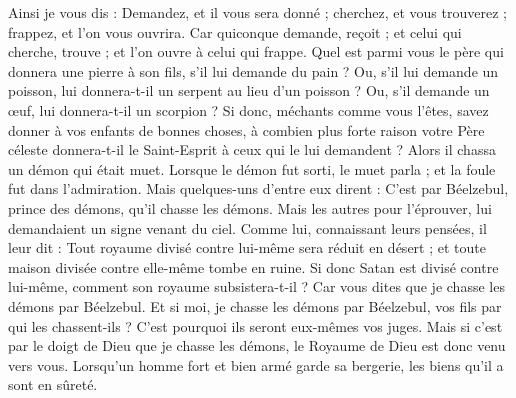 \begin{multicols}{2}
Ainsi je vous dis : Demandez, et il vous sera donné ; cherchez, et vous trouverez ; frappez, et l'on vous ouvrira.
Car quiconque demande, reçoit ; et celui qui cherche, trouve ; et l'on ouvre à celui qui frappe.
Quel est parmi vous le père qui donnera une pierre à son fils, s'il lui demande du pain ? Ou, s'il lui demande un poisson, lui donnera-t-il un serpent au lieu d'un poisson ?
Ou, s'il demande un œuf, lui donnera-t-il un scorpion ?
Si donc, méchants comme vous l'êtes, savez donner à vos enfants de bonnes choses, à combien plus forte raison votre Père céleste donnera-t-il le Saint-Esprit à ceux qui le lui demandent ?
Alors il chassa un démon qui était muet. Lorsque le démon fut sorti, le muet parla ; et la foule fut dans l'admiration.
Mais quelques-uns d'entre eux dirent : C'est par Béelzebul, prince des démons, qu'il chasse les démons.
Mais les autres pour l'éprouver, lui demandaient un signe venant du ciel.
Comme lui, connaissant leurs pensées, il leur dit : Tout royaume divisé contre lui-même sera réduit en désert ; et toute maison divisée contre elle-même tombe en ruine.
Si donc Satan est divisé contre lui-même, comment son royaume subsistera-t-il ? Car vous dites que je chasse les démons par Béelzebul.
Et si moi, je chasse les démons par Béelzebul, vos fils par qui les chassent-ils ? C'est pourquoi ils seront eux-mêmes vos juges.
Mais si c'est par le doigt de Dieu que je chasse les démons, le Royaume de Dieu est donc venu vers vous.
Lorsqu'un homme fort et bien armé garde sa bergerie, les biens qu'il a sont en sûreté.

\end{multicols}
